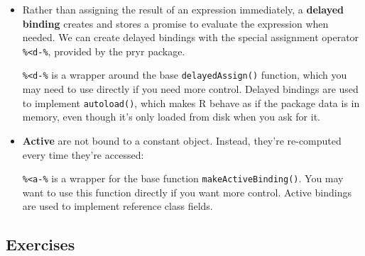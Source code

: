 \begin{itemize}
\item
  Rather than assigning the result of an expression immediately, a
  \textbf{delayed binding} creates and stores a promise to evaluate the
  expression when needed. We can create delayed bindings with the
  special assignment operator \texttt{\%\textless{}d-\%}, provided by
  the pryr package.

\begin{Shaded}
\end{Shaded}

  \texttt{\%\textless{}d-\%} is a wrapper around the base
  \texttt{delayedAssign()} function, which you may need to use directly
  if you need more control. Delayed bindings are used to implement
  \texttt{autoload()}, which makes R behave as if the package data is in
  memory, even though it's only loaded from disk when you ask for it.
\item
  \textbf{Active} are not bound to a constant object. Instead, they're
  re-computed every time they're accessed:

\begin{Shaded}
\end{Shaded}

  \texttt{\%\textless{}a-\%} is a wrapper for the base function
  \texttt{makeActiveBinding()}. You may want to use this function
  directly if you want more control. Active bindings are used to
  implement reference class fields. 
\end{itemize}

\subsection{Exercises}

